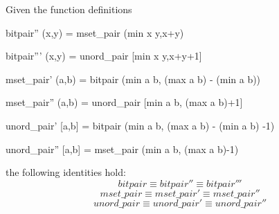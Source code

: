 \documentclass[]{INCLUDES/llncs}
\begin{document}
\begin{prop}
Given the function definitions
\begin{code}
bitpair'' (x,y) = mset_pair (min x y,x+y) 

bitpair''' (x,y) = unord_pair [min x y,x+y+1]

mset_pair' (a,b) = bitpair (min a b, (max a b) - (min a b)) 

mset_pair'' (a,b) = unord_pair [min a b, (max a b)+1]

unord_pair' [a,b] = bitpair (min a b, (max a b) - (min a b) -1) 

unord_pair'' [a,b] = mset_pair (min a b, (max a b)-1)
\end{code}
the following identities hold:
\begin{equation}
bitpair \equiv bitpair'' \equiv bitpair '''
\end{equation}
\begin{equation} \label{mseteq}
mset\_pair \equiv mset\_pair' \equiv mset\_pair ''
\end{equation}
\begin{equation}
unord\_pair \equiv unord\_pair' \equiv unord\_pair ''
\end{equation}
\end{prop}
\end{document}
